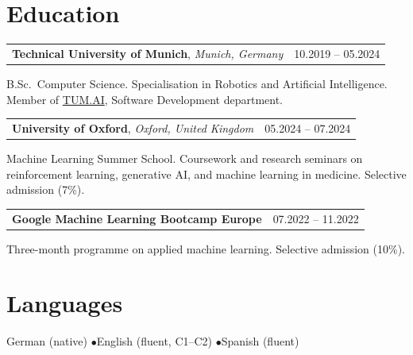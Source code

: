 \documentclass[11pt,a4paper]{article}
\makeatletter
\newcommand{\cventry}[3]{%
    \begin{tabularx}{\textwidth}{@{}Xr@{}}
        \textbf{#1}, \textit{#2} & #3 \\
    \end{tabularx}%
    \vspace{-0.35em}\par%
}
\newcommand{\cvitem}[2]{%
    \begin{tabularx}{\textwidth}{@{}Xr@{}}
        \textbf{#1} & #2 \\
    \end{tabularx}%
    \vspace{-0.35em}\par%
}
\makeatother
\begin{document}
\section*{Education}

\cventry{Technical University of Munich}{Munich, Germany}{10.2019 -- 05.2024}
B.Sc.\ Computer Science. Specialisation in Robotics and Artificial Intelligence. Member of \href{https://www.tum-ai.com/}{TUM.AI}, Software Development department.

\vspace{0.25em}
\cventry{University of Oxford}{Oxford, United Kingdom}{05.2024 -- 07.2024}
Machine Learning Summer School. Coursework and research seminars on reinforcement learning, generative AI, and machine learning in medicine. Selective admission (7\%).

\vspace{0.25em}
\cvitem{Google Machine Learning Bootcamp Europe}{07.2022 -- 11.2022}
Three-month programme on applied machine learning. Selective admission (10\%).

\section*{Languages}

German (native) \enspace$\bullet$\enspace English (fluent, C1--C2) \enspace$\bullet$\enspace Spanish (fluent)
\end{document}
